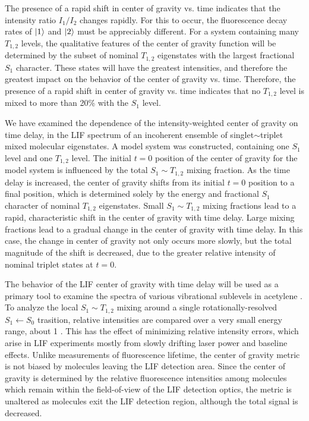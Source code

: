 \documentclass[12pt]{mitthesis}
\begin{document}
The presence of a rapid shift in center of gravity vs. time indicates
that the intensity ratio $I_1/I_2$ changes rapidly.  For this to
occur, the fluorescence decay rates of $\mathinner{|{1}\rangle}$ and $\mathinner{|{2}\rangle}$ must be
appreciably different.  For a system containing many $T_{1,2}$ levels,
the qualitative features of the center of gravity function will be
determined by the subset of nominal $T_{1,2}$ eigenstates with the
largest fractional $S_1$ character.  These states will have the
greatest intensities, and therefore the greatest impact on the
behavior of the center of gravity vs. time.  Therefore, the presence
of a rapid shift in center of gravity vs. time indicates that no
$T_{1,2}$ level is mixed to more than 20\% with the $S_1$ level.

We have examined the dependence of the intensity-weighted center of
gravity on time delay, in the LIF spectrum of an incoherent ensemble
of singlet$\sim$triplet mixed molecular eigenstates.  A model system
was constructed, containing one $S_1$ level and one $T_{1,2}$ level.
The initial $t=0$ position of the center of gravity for the model
system is influenced by the total $S_1 \sim T_{1,2}$ mixing fraction.
As the time delay is increased, the center of gravity shifts from its
initial $t=0$ position to a final position, which is determined solely
by the energy and fractional $S_1$ character of nominal $T_{1,2}$
eigenstates.  Small $S_1 \sim T_{1,2}$ mixing fractions lead to a
rapid, characteristic shift in the center of gravity with time delay.
Large mixing fractions lead to a gradual change in the center of
gravity with time delay.  In this case, the change in center of
gravity not only occurs more slowly, but the total magnitude of the
shift is decreased, due to the greater relative intensity of nominal
triplet states at $t=0$.

The behavior of the LIF center of gravity with time delay will be used
as a primary tool to examine the spectra of various vibrational
sublevels in acetylene \astate.  To analyze the local $S_1 \sim
T_{1,2}$ mixing around a single rotationally-resolved $S_1 \leftarrow
S_0$ trasition, relative intensities are compared over a very small
energy range, about 1 \rcm.  This has the effect of minimizing
relative intensity errors, which arise in LIF experiments mostly from
slowly drifting laser power and baseline effects.  Unlike measurements
of fluorescence lifetime, the center of gravity metric is not biased
by molecules leaving the LIF detection area.  Since the center of
gravity is determined by the relative fluorescence intensities among
molecules which remain within the field-of-view of the LIF detection
optics, the metric is unaltered as molecules exit the LIF detection
region, although the total signal is decreased.
\end{document}
